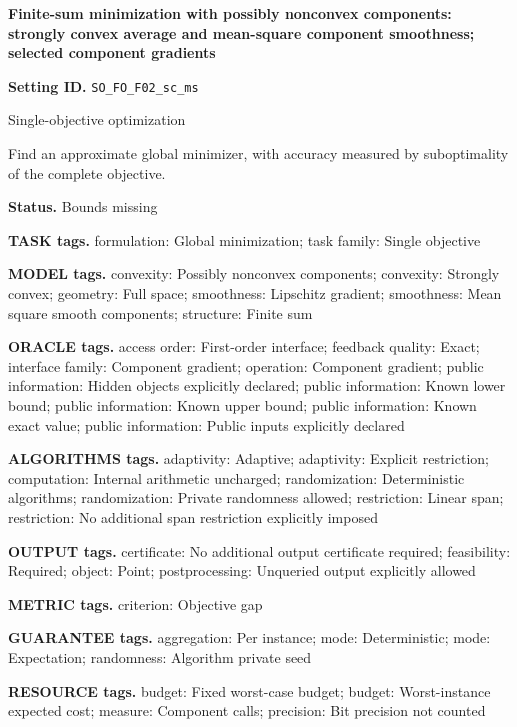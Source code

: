 \documentclass[10pt,a4paper]{article}
\begin{document}
\raggedright

{\LARGE\bfseries\sffamily\color{AtlasNavy} Finite-sum minimization with possibly nonconvex components: strongly convex average and mean-square component smoothness; selected component gradients\par}\vspace{5pt}
\textbf{Setting ID.} \texttt{SO\_\allowbreak{}\allowbreak{}FO\_\allowbreak{}\allowbreak{}F02\_\allowbreak{}\allowbreak{}sc\_\allowbreak{}\allowbreak{}ms}

Single-objective optimization

Find an approximate global minimizer, with accuracy measured by suboptimality of the complete objective.

\textbf{Status.} Bounds missing

\textbf{TASK tags.} formulation: Global minimization; task family: Single objective

\textbf{MODEL tags.} convexity: Possibly nonconvex components; convexity: Strongly convex; geometry: Full space; smoothness: Lipschitz gradient; smoothness: Mean square smooth components; structure: Finite sum

\textbf{ORACLE tags.} access order: First-order interface; feedback quality: Exact; interface family: Component gradient; operation: Component gradient; public information: Hidden objects explicitly declared; public information: Known lower bound; public information: Known upper bound; public information: Known exact value; public information: Public inputs explicitly declared

\textbf{ALGORITHMS tags.} adaptivity: Adaptive; adaptivity: Explicit restriction; computation: Internal arithmetic uncharged; randomization: Deterministic algorithms; randomization: Private randomness allowed; restriction: Linear span; restriction: No additional span restriction explicitly imposed

\textbf{OUTPUT tags.} certificate: No additional output certificate required; feasibility: Required; object: Point; postprocessing: Unqueried output explicitly allowed

\textbf{METRIC tags.} criterion: Objective gap

\textbf{GUARANTEE tags.} aggregation: Per instance; mode: Deterministic; mode: Expectation; randomness: Algorithm private seed

\textbf{RESOURCE tags.} budget: Fixed worst-case budget; budget: Worst-instance expected cost; measure: Component calls; precision: Bit precision not counted
\end{document}
